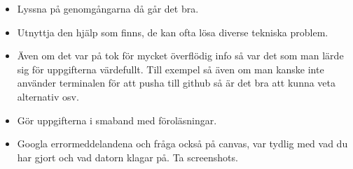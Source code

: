\begin{itemize}
  \item Lyssna på genomgångarna då går det bra.
  \item Utnyttja den hjälp som finns, de kan ofta lösa diverse tekniska 
    problem.
  \item Även om det var på tok för mycket överflödig info så var det som man 
    lärde sig för uppgifterna värdefullt. Till exempel så även om man kanske
    inte använder terminalen för att pusha till github så är det bra att kunna 
    veta alternativ osv.
  \item Gör uppgifterna i smaband med föroläsningar.
  \item Googla errormeddelandena och fråga också på canvas, var tydlig med vad 
    du har gjort och vad datorn klagar på. Ta screenshots.
\end{itemize}
